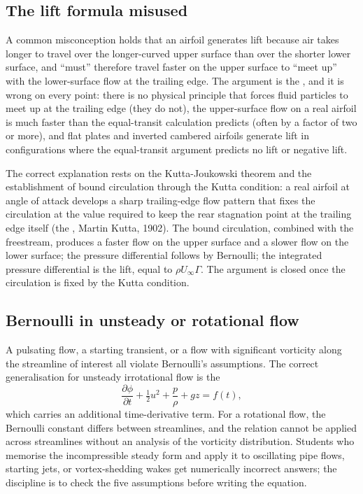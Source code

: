 \subsection{The lift formula misused}

A common misconception holds that an airfoil generates lift
because air takes longer to travel over the longer-curved upper
surface than over the shorter lower surface, and ``must''
therefore travel faster on the upper surface to ``meet up'' with
the lower-surface flow at the trailing edge. The argument is the
, and it is wrong on every
point: there is no physical principle that forces fluid particles
to meet up at the trailing edge (they do not), the upper-surface
flow on a real airfoil is much faster than the equal-transit
calculation predicts (often by a factor of two or more), and flat
plates and inverted cambered airfoils generate lift in
configurations where the equal-transit argument predicts no lift
or negative lift.

The correct explanation rests on the Kutta-Joukowski theorem and
the establishment of bound circulation through the Kutta
condition: a real airfoil at angle of attack develops a sharp
trailing-edge flow pattern that fixes the circulation at the value
required to keep the rear stagnation point at the trailing edge
itself (the , Martin Kutta, 1902). The
bound circulation, combined with the freestream, produces a
faster flow on the upper surface and a slower flow on the lower
surface; the pressure differential follows by Bernoulli; the
integrated pressure differential is the lift, equal to
$\rho U_\infty \Gamma$. The argument is closed once the
circulation is fixed by the Kutta condition.

\subsection{Bernoulli in unsteady or rotational flow}

A pulsating flow, a starting transient, or a flow with significant
vorticity along the streamline of interest all violate Bernoulli's
assumptions. The correct generalisation for unsteady irrotational
flow is the 
\[
\frac{\partial \phi}{\partial t} + \tfrac{1}{2}u^2 + \frac{p}{\rho}
+ gz = f(t),
\]
which carries an additional time-derivative term. For a rotational
flow, the Bernoulli constant differs between streamlines, and the
relation cannot be applied across streamlines without an analysis
of the vorticity distribution. Students who memorise the
incompressible steady form and apply it to oscillating pipe flows,
starting jets, or vortex-shedding wakes get numerically incorrect
answers; the discipline is to check the five assumptions before
writing the equation.

